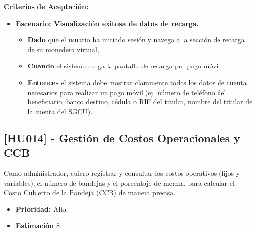 \documentclass[12pt]{article}
\begin{document}
\textbf{Criterios de Aceptación:}
\begin{itemize}
	\item \textbf{Escenario: Visualización exitosa de datos de recarga.}
	\begin{itemize}
		\item \textbf{Dado} que el usuario ha iniciado sesión y navega a la sección de recarga de su monedero virtual,
		\item \textbf{Cuando} el sistema carga la pantalla de recarga por pago móvil,
		\item \textbf{Entonces} el sistema debe mostrar claramente todos los datos de cuenta necesarios para realizar un pago móvil (ej. número de teléfono del beneficiario, banco destino, cédula o RIF del titular, nombre del titular de la cuenta del SGCU).
	\end{itemize}
\end{itemize}

\pagebreak

\subsection{[HU014] - Gestión de Costos Operacionales y CCB}

Como administrador, quiero registrar y consultar los costos operativos (fijos y variables), el número de bandejas y el porcentaje de merma, para calcular el Costo Cubierto de la Bandeja (CCB) de manera precisa.

\begin{itemize}
	\item \textbf{Prioridad:} Alta
	\item \textbf{Estimación} 8
\end{itemize}
\end{document}
